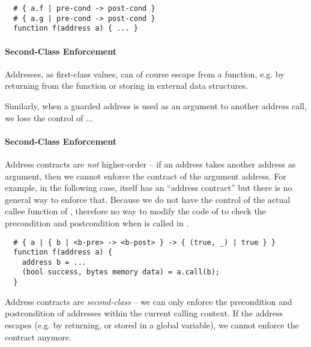 
\begin{lstlisting}
  # { a.f | pre-cond -> post-cond }
  # { a.g | pre-cond -> post-cond }
  function f(address a) { ... }
\end{lstlisting}

\fi

\paragraph{Second-Class Enforcement}
Addresses, as first-class values, can of course escape from a function, e.g.
by returning from the function or storing in external data structures.

Similarly, when a guarded address is used as an argument to another address
call, we lose the control of ...

\paragraph{Second-Class Enforcement}
Address contracts are \emph{not} higher-order -- if an address takes another
address as argument, then we cannot enforce the contract of the argument
address.
For example, in the following case,  itself has an ``address contract''
 but there is no general way to enforce that.
Because we do not have the control of the actual callee function of ,
therefore no way to modify the code of  to check the precondition
and postcondition when  is called in .

\begin{lstlisting}
  # { a | { b | <b-pre> -> <b-post> } -> { (true, _) | true } }
  function f(address a) {
    address b = ...
    (bool success, bytes memory data) = a.call(b);
  }
\end{lstlisting}

Address contracts are \emph{second-class} -- we can only enforce the
precondition and postcondition of addresses within the current calling
context.  If the address escapes (e.g. by returning, or stored in a global
variable), we cannot enforce the contract anymore.


